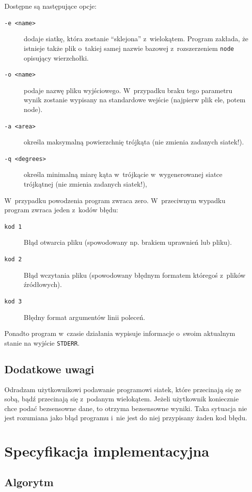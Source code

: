 \documentclass[a4paper]{article}
\begin{document}
Dostępne są następujące opcje:
\begin{description}
  \item[\texttt{-e <name>}] dodaje siatkę, która zostanie ``sklejona'' z~wielokątem. Program zakłada, że istnieje także plik o~takiej samej nazwie bazowej z~rozszerzeniem \texttt{node} opisujący wierzchołki.
  \item[\texttt{-o <name>}] podaje nazwę pliku wyjściowego. W~przypadku braku tego parametru wynik zostanie wypisany na standardowe wejście (najpierw plik ele, potem node).
  \item[\texttt{-a <area>}] określa maksymalną powierzchnię trójkąta (nie zmienia zadanych siatek!).
  \item[\texttt{-q <degrees>}] określa minimalną miarę kąta w~trójkącie w~wygenerowanej siatce trójkątnej (nie zmienia zadanych siatek!),
\end{description}

W~przypadku powodzenia program zwraca zero. W~przeciwnym wypadku program zwraca jeden z~kodów błędu:

\begin{description}
  \item[\texttt{kod 1}] Błąd otwarcia pliku (spowodowany np. brakiem uprawnień lub pliku).
  \item[\texttt{kod 2}] Błąd wczytania pliku (spowodowany błędnym formatem któregoś z~plików źródłowych).
  \item[\texttt{kod 3}] Błędny format argumentów linii poleceń.
\end{description}

Ponadto program w~czasie działania wypisuje informacje o~swoim aktualnym stanie na wyjście \texttt{STDERR}.

\subsection{Dodatkowe uwagi}
Odradzam użytkownikowi podawanie programowi siatek, które przecinają się ze sobą, bądź przecinają się z~podanym wielokątem.
Jeżeli użytkownik koniecznie chce podać bezsensowne dane, to otrzyma bezsensowne wyniki.
Taka sytuacja nie jest rozumiana jako błąd programu i~nie jest do niej przypisany żaden kod błędu.

\newpage
\section{Specyfikacja implementacyjna}
\subsection{Algorytm}
\end{document}
